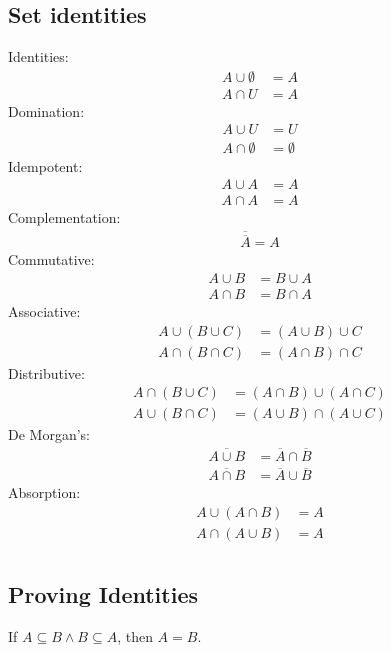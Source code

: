 \subsection{Set identities}
Identities:
\begin{align}
    A \cup \emptyset & = A \\
    A \cap U         & = A
\end{align}
Domination:
\begin{align}
    A \cup U         & = U         \\
    A \cap \emptyset & = \emptyset
\end{align}
Idempotent:
\begin{align}
    A \cup A & = A \\
    A \cap A & = A
\end{align}
Complementation:
\begin{align}
    \overline{\overline{A}} = A
\end{align}
Commutative:
\begin{align}
    A \cup B & = B \cup A \\
    A \cap B & = B \cap A
\end{align}
Associative:
\begin{align}
    A \cup (B \cup C) & = (A \cup B) \cup C \\
    A \cap (B \cap C) & = (A \cap B) \cap C
\end{align}
Distributive:
\begin{align}
    A \cap (B \cup C) & = (A \cap B) \cup (A \cap C) \\
    A \cup (B \cap C) & = (A \cup B) \cap (A \cup C)
\end{align}
De Morgan's:
\begin{align}
    \overline{A \cup B} & = \overline{A} \cap \overline{B} \\
    \overline{A \cap B} & = \overline{A} \cup \overline{B}
\end{align}
Absorption:
\begin{align}
    A \cup (A \cap B) & = A \\
    A \cap (A \cup B) & = A \\
\end{align}

\subsection{Proving Identities}
If \(A \subseteq B \land B \subseteq A\), then \(A = B\).

